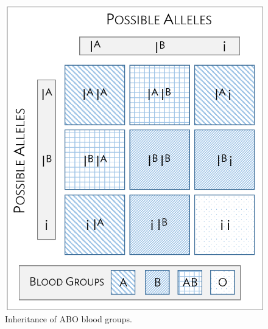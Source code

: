 \begin{figure}[h]
	\centering
	\includegraphics[height= 0.65\textwidth]{ch_probability_oi_biostat/figures/aboInheritance/aboInheritance.png}
	\caption{Inheritance of ABO blood groups.}
	\label{fig:aboInheritance}
\end{figure}

